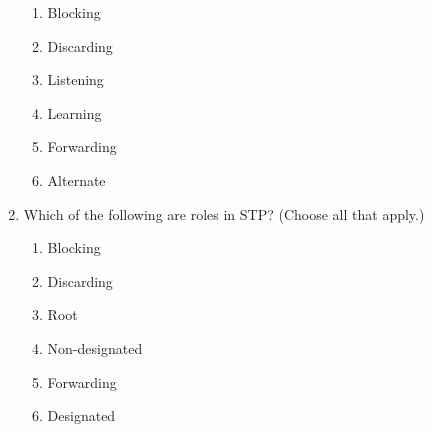 \begin{enumerate}
  \begin{enumerate}
  \tightlist
  \item
    Blocking
  \item
    Discarding
  \item
    Listening
  \item
    Learning
  \item
    Forwarding
  \item
    Alternate
  \end{enumerate}
\item
  Which of the following are roles in STP? (Choose all that apply.)

  \begin{enumerate}
  \tightlist
  \item
    Blocking
  \item
    Discarding
  \item
    Root
  \item
    Non-designated
  \item
    Forwarding
  \item
    Designated
  \end{enumerate}
\end{enumerate}


